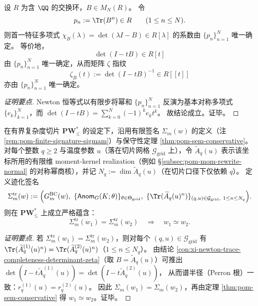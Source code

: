\begin{conclusion}\label{con:xi-newton-trace-completeness-determinant-zeta}
设 \(R\) 为含 \(\QQ\) 的交换环，\(B\in M_N(R)\)。
令
\[
p_n:=\Tr(B^n)\in R\qquad (1\le n\le N).
\]
则首一特征多项式 \(\chi_B(\lambda)=\det(\lambda I-B)\in R[\lambda]\) 的系数由 \(\{p_n\}_{n=1}^{N}\) 唯一确定。
等价地，
\[
\det(I-tB)\in R[t]
\]
由 \(\{p_n\}_{n=1}^{N}\) 唯一确定，从而矩阵 \(\zeta\) 指纹
\[
\zeta_B(t):=\det(I-tB)^{-1}\in R[[t]]
\]
亦由 \(\{p_n\}_{n=1}^{N}\) 唯一确定。
\end{conclusion}
\begin{proof}[证明要点]
Newton 恒等式以有限步将幂和 \(\{p_n\}_{n=1}^{N}\) 反演为基本对称多项式 \(\{e_k\}_{k=1}^{N}\)，而
\(
\det(I-tB)=\sum_{k=0}^{N}(-1)^ke_kt^k
\)。
故结论成立。证毕。
\end{proof}

\begin{conclusion}\label{con:xi-trace-compressed-signature-complete}
在有界复杂度切片 \(\mathbf{PW}^{\ast}_{\le}\) 的设定下，沿用有限签名 \(\Sigma_m(w)\) 的定义（注 \ref{rem:pom-finite-signature-sigmam}）与保守性定理 \ref{thm:pom-sem-conservative}。
对每个整数 \(q\ge 2\) 与温度参数 \(u\)（落在切片网格 \(\mathcal{G}_{\mathrm{grid}}\) 上），令 \(\widetilde A_q(u)\) 表示该坐标所用的有限维 moment-kernel realization（例如 \S\ref{subsec:pom-mom-rewrite-normal} 的对称幂商核），并记 \(N_q:=\dim \widetilde A_q(u)\)（在切片口径下仅依赖 \(q\)）。
定义迹化签名
\[
\Sigma_m^{\mathrm{tr}}(w):=
\Bigl(
G^{\mathrm{BC}}_m(w),\
\{\mathsf{Anom}_{G}(K;\theta)\}_{\theta\in\Theta_{\mathrm{grid}}},\
\{\Tr(\widetilde A_q(u)^n)\}_{(q,u)\in\mathcal{G}_{\mathrm{grid}},\ 1\le n\le N_q}
\Bigr).
\]
则在 \(\mathbf{PW}^{\ast}_{\le}\) 上成立严格蕴含：
\[
\Sigma_m^{\mathrm{tr}}(w_1)=\Sigma_m^{\mathrm{tr}}(w_2)\quad\Longrightarrow\quad w_1\simeq w_2.
\]
\end{conclusion}
\begin{proof}[证明要点]
若 \(\Sigma_m^{\mathrm{tr}}(w_1)=\Sigma_m^{\mathrm{tr}}(w_2)\)，则对每个 \((q,u)\in\mathcal{G}_{\mathrm{grid}}\) 有
\(
\Tr(\widetilde A_q^{(1)}(u)^n)=\Tr(\widetilde A_q^{(2)}(u)^n)
\)（\(1\le n\le N_q\)）。
由结论 \ref{con:xi-newton-trace-completeness-determinant-zeta}（取 \(B=\widetilde A_q(u)\)）可推出
\(
\det(I-t\widetilde A_q^{(1)}(u))=\det(I-t\widetilde A_q^{(2)}(u))
\)，
从而谱半径（Perron 根）一致：\(r_q^{(1)}(u)=r_q^{(2)}(u)\)。
因此 \(\Sigma_m(w_1)=\Sigma_m(w_2)\)，再由定理 \ref{thm:pom-sem-conservative} 得 \(w_1\simeq w_2\)。证毕。
\end{proof}

\endinput
